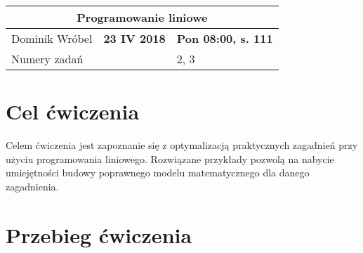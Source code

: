 \documentclass[a4paper,15pt]{article}
\begin{document}
\begin{table}
\begin{center}
\begin{tabular}{|l|l|l|}
\hline
\multicolumn{3}{|c|}{\textbf{Programowanie liniowe}} \\ \hline Dominik Wróbel & \textbf{23 IV 2018} & \textbf{Pon 08:00, s. 111} \\ \hline
\multicolumn{2}{|l|}{Numery zadań} & 2, 3 \\ \hline 

\end{tabular}
\end{center}
\end{table}

\section{Cel ćwiczenia}
Celem ćwiczenia jest zapoznanie się z optymalizacją praktycznych zagadnień przy użyciu programowania liniowego. Rozwiązane przykłady pozwolą na nabycie umiejętności budowy poprawnego modelu matematycznego dla danego zagadnienia. 
\section{Przebieg ćwiczenia}
\end{document}
